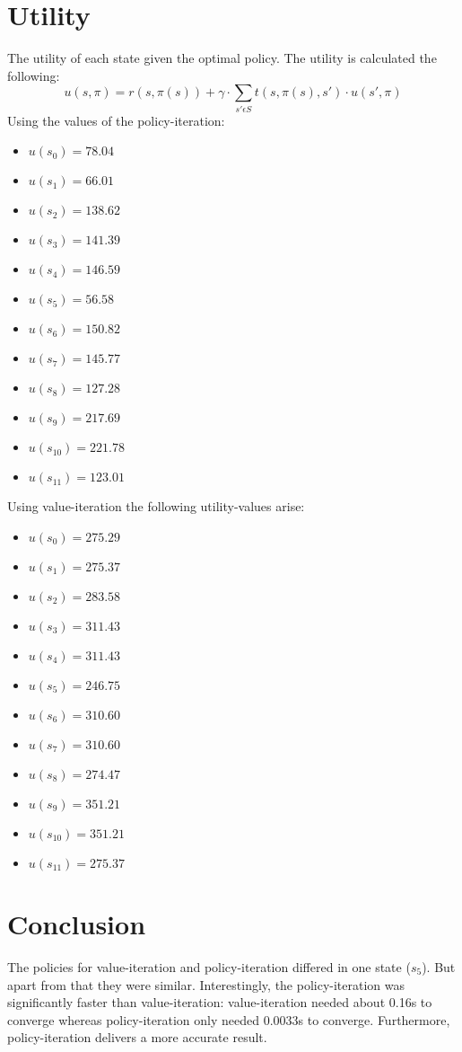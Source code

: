 \documentclass[a4paper]{article}
\begin{document}
\section{Utility}
The utility of each state given the optimal policy. The utility is calculated the following:
\begin{equation}
u(s,\pi) = r(s,\pi(s)) + \gamma \cdot \sum_{s' \epsilon S} t(s,\pi(s),s') \cdot u(s',\pi)
\end{equation}
Using the values of the policy-iteration:
\begin{multicols}{2}
\begin{itemize}
\item $u(s_0) = 78.04 $
\item $u(s_1) = 66.01 $
\item $u(s_2) = 138.62 $
\item $u(s_3) = 141.39 $
\item $u(s_4) = 146.59 $
\item $u(s_5) = 56.58 $
\item $u(s_6) = 150.82 $
\item $u(s_7) = 145.77 $
\item $u(s_8) = 127.28 $
\item $u(s_9) = 217.69 $
\item $u(s_{10}) = 221.78 $
\item $u(s_{11}) = 123.01 $
\end{itemize}
\end{multicols}

\noindent
Using value-iteration the following utility-values arise:
\begin{multicols}{2}
\begin{itemize}
\item $u(s_0) = 275.29 $
\item $u(s_1) = 275.37 $
\item $u(s_2) = 283.58 $
\item $u(s_3) = 311.43 $
\item $u(s_4) = 311.43 $
\item $u(s_5) = 246.75 $
\item $u(s_6) = 310.60 $
\item $u(s_7) = 310.60 $
\item $u(s_8) = 274.47 $
\item $u(s_9) = 351.21 $
\item $u(s_{10}) = 351.21 $
\item $u(s_{11}) = 275.37 $
\end{itemize}
\end{multicols}

\section{Conclusion}
The policies for value-iteration and policy-iteration differed in one state ($s_5$). But apart from that they were similar. Interestingly, the policy-iteration was significantly faster than value-iteration: value-iteration needed about 0.16s to converge whereas policy-iteration only needed 0.0033s to converge. Furthermore, policy-iteration delivers a more accurate result. 
\end{document}
